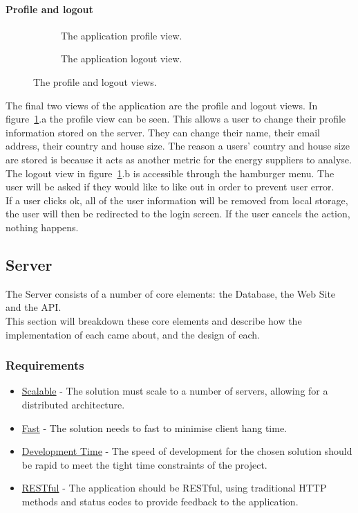 \documentclass[preprint,12pt,3p]{elsarticle}
\begin{document}
\paragraph{Profile and logout}
\begin{figure}[H]
    \centering
    \begin{subfigure}[t]{0.32\columnwidth}
        \centering
        \caption{The application profile view.}
    \end{subfigure}
    \begin{subfigure}[t]{0.32\columnwidth}
        \centering
        \caption{The application logout view.}
    \end{subfigure}
    \caption{The profile and logout views.}
    \label{fig:profilelogout}
\end{figure}
The final two views of the application are the profile and logout views.
In figure~\ref{fig:profilelogout}.a the profile view can be seen. This allows a user to change their profile information stored on the server. They can change their name, their email address, their country and house size. The reason a users' country and house size are stored is because it acts as another metric for the energy suppliers to analyse.\\
The logout view in figure~\ref{fig:profilelogout}.b is accessible through the hamburger menu. The user will be asked if they would like to like out in order to prevent user error.\\
If a user clicks ok, all of the user information will be removed from local storage, the user will then be redirected to the login screen. If the user cancels the action, nothing happens. 


\subsection{Server}
The Server consists of a number of core elements: the Database, the Web Site and the API.\\
This section will breakdown these core elements and describe how the implementation of each came about, and the design of each.
\subsubsection{Requirements}
\begin{itemize}
\item \underline{Scalable} - The solution must scale to a number of servers, allowing for a distributed architecture.
\item \underline{Fast} - The solution needs to fast to minimise client hang time.
\item \underline{Development Time} - The speed of development for the chosen solution should be rapid to meet the tight time constraints of the project.
\item \underline{RESTful} - The application should be RESTful, using traditional HTTP methods and status codes to provide feedback to the application.
\end{itemize}
\end{document}
